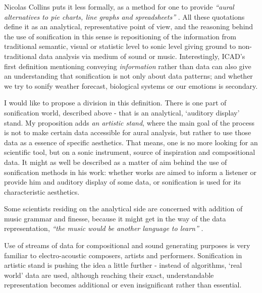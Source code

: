 \documentclass[11pt,a4paper,oneside]{report}
\begin{document}
Nicolas Collins puts it less formally, as a method for one to provide \emph{``aural alternatives to pie charts, line graphs and spreadsheets''} \cite{Collins2006}. All these quotations define it as an analytical, representative point of view, and the reasoning behind the use of sonification in this sense is repositioning of the information from traditional semantic, visual or statistic level to sonic level giving ground to non-traditional data analysis via medium of sound or music. Interestingly, ICAD's first definition mentioning conveying \emph{information} rather than data can also give an understanding that sonification is not only about data patterns; and whether we try to sonify weather forecast, biological systems or our emotions is secondary.

I would like to propose a division in this definition. There is one part of sonification world, described above - that is an analytical, `auditory display' stand. My proposition adds \emph{an artistic stand}, where the main goal of the process is not to make certain data accessible for aural analysis, but rather to use those data as a essence of specific aesthetics. That means, one is no more looking for an scientific tool, but on a sonic instrument, source of inspiration and compositional data. It might as well be described as a matter of aim behind the use of sonification methods in his work: whether works are aimed to inform a listener or provide him and auditory display of some data, or sonification is used for its characteristic aesthetics.

Some scientists residing on the analytical side are concerned with addition of music grammar and finesse, because it might get in the way of the data representation, \emph{``the music would be another language to learn''} \cite{Vickers2006}.

Use of streams of data for compositional and sound generating purposes is very familiar to electro-acoustic composers, artists and performers. Sonification in artistic stand is pushing the idea a little further - instead of algorithms, `real world' data are used, although reaching their exact, understandable representation becomes additional or even insignificant rather than essential.

\end{document}

